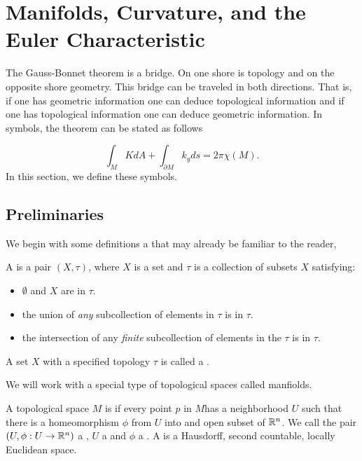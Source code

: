 
\section{Manifolds, Curvature, and the Euler Characteristic}
\label{sec:cast}


The Gauss-Bonnet theorem is a bridge. On one shore is topology and
on the opposite shore geometry. This bridge can be traveled in both directions.
That is, if one has geometric information one can deduce topological information and
if one has topological information one can deduce geometric information.
In symbols, the theorem can be stated as follows

\begin{equation} \label{eqn:g-b}
\int_M K dA + \int_{\partial M} k_g ds = 2\pi \chi(M).
\end{equation}
In this section, we define these symbols.

\subsection{Preliminaries}

We begin with some definitions a that may already be familiar to the reader,
\begin{definition}
A  is a pair $(X,\tau)$, where $X$ is a set and
 $\tau$ is a collection of subsets $X$
satisfying:
	\begin{itemize}
		\item $\emptyset$ and $X$ are in $\tau.$
		\item the union of \emph{any} subcollection of elements in $\tau$ is  in $\tau.$
		\item the intersection of any \emph{finite} subcollection of elements in the $\tau$ is in $\tau.$
	\end{itemize}
A set $X$ with a specified topology $\tau$ is called a .
\end{definition}

We will work with a special type of topological spaces called manfiolds.

\begin{definition}
	A topological space $M$ is 
	if every point $p$ in $M$has a neighborhood $U$ such that there is  a
	homeomorphism  $\phi$ from $U$ into and open  subset of $\mathbb{R}^n$.
	We call the pair $(U,\phi: U\to \mathbb{R}^n)$ a , $U$ a 
	and  $\phi$ a . 
A  is a Hausdorff, second countable, locally Euclidean space.
\end{definition}

